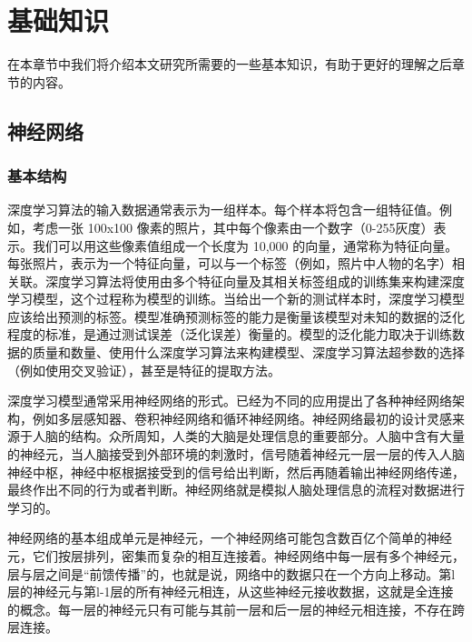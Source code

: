 \chapter{基础知识}
\label{ch2}
在本章节中我们将介绍本文研究所需要的一些基本知识，有助于更好的理解之后章节的内容。

\section{神经网络}
\subsection{基本结构}
深度学习算法的输入数据通常表示为一组样本。每个样本将包含一组特征值。例如，考虑一张 100x100 像素的照片，其中每个像素由一个数字（0-255灰度）表示。我们可以用这些像素值组成一个长度为 10,000 的向量，通常称为特征向量。每张照片，表示为一个特征向量，可以与一个标签（例如，照片中人物的名字）相关联。深度学习算法将使用由多个特征向量及其相关标签组成的训练集来构建深度学习模型，这个过程称为模型的训练。当给出一个新的测试样本时，深度学习模型应该给出预测的标签。模型准确预测标签的能力是衡量该模型对未知的数据的泛化程度的标准，是通过测试误差（泛化误差）衡量的。模型的泛化能力取决于训练数据的质量和数量、使用什么深度学习算法来构建模型、深度学习算法超参数的选择（例如使用交叉验证），甚至是特征的提取方法。

深度学习模型通常采用神经网络的形式。已经为不同的应用提出了各种神经网络架构，例如多层感知器、卷积神经网络和循环神经网络。神经网络最初的设计灵感来源于人脑的结构。众所周知，人类的大脑是处理信息的重要部分。人脑中含有大量的神经元，当人脑接受到外部环境的刺激时，信号随着神经元一层一层的传入人脑神经中枢，神经中枢根据接受到的信号给出判断，然后再随着输出神经网络传递，最终作出不同的行为或者判断。神经网络就是模拟人脑处理信息的流程对数据进行学习的。

神经网络的基本组成单元是神经元，一个神经网络可能包含数百亿个简单的神经元，它们按层排列，密集而复杂的相互连接着。神经网络中每一层有多个神经元，层与层之间是“前馈传播”的，也就是说，网络中的数据只在一个方向上移动。第l层的神经元与第l-1层的所有神经元相连，从这些神经元接收数据，这就是全连接的概念。每一层的神经元只有可能与其前一层和后一层的神经元相连接，不存在跨层连接。

